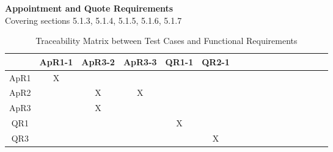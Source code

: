 \documentclass[12pt, titlepage]{article}
\begin{document}
\noindent \textbf{Appointment and Quote Requirements}\\
Covering sections 5.1.3, 5.1.4, 5.1.5, 5.1.6, 5.1.7
\begin{table}[H]
    \tiny
    \centering
    \begin{tabular}{|c|c|c|c|c|c|c|c|c|c|c|c|c|c|c|c|c|}
        \hline
        &       ApR1-1&ApR3-2&ApR3-3&QR1-1&QR2-1 \\ \hline
        ApR1 &       X&      &      &      &      \\ \hline
        ApR2 &        &     X&     X&      &      \\ \hline
        ApR3 &        &     X&      &      &      \\ \hline
        QR1  &        &      &      &     X&      \\ \hline
        QR3  &        &      &      &      &     X \\ \hline
    \end{tabular}
    \caption{Traceability Matrix between Test Cases and Functional Requirements}
\end{table}
\end{document}
